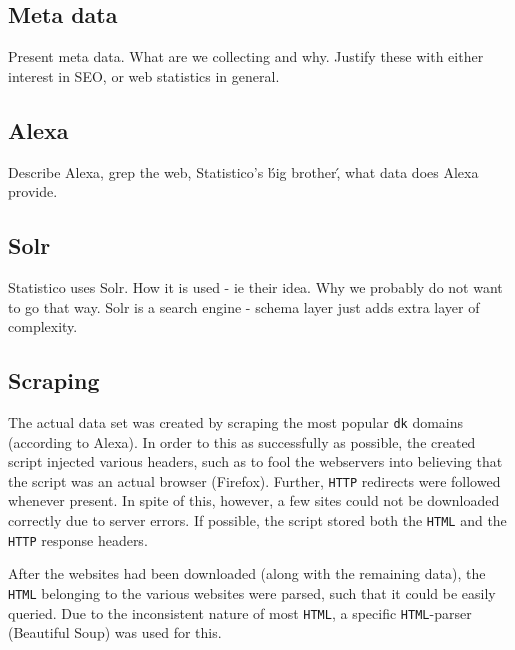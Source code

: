 \subsection{Meta data}
\label{subsec:meta_data}
Present meta data. What are we collecting and why. Justify these with either interest in SEO, or web statistics in general.

\subsection{Alexa}
\label{subsec:alexa}
Describe Alexa, grep the web, Statistico's \'big brother\', what data does Alexa provide.

\subsection{Solr}
\label{subsec:solr}
Statistico uses Solr. How it is used - ie their idea. Why we probably do not want to go that way. Solr is a search engine - schema layer just adds extra layer of complexity.

\subsection{Scraping}
\label{subsec:scraping}


The actual data set was created by scraping the most popular \texttt{dk} domains (according to Alexa). In order to this as successfully as possible, the created script injected various headers, such as to fool the webservers into believing that the script was an actual browser (Firefox). Further, \texttt{HTTP} redirects were followed whenever present. In spite of this, however, a few sites could not be downloaded correctly due to server errors. If possible, the script stored both the \texttt{HTML} and the \texttt{HTTP} response headers.

After the websites had been downloaded (along with the remaining data), the \texttt{HTML} belonging to the various websites were parsed, such that it could be easily queried. Due to the inconsistent nature of most \texttt{HTML}, a specific \texttt{HTML}-parser (Beautiful Soup) was used for this.
